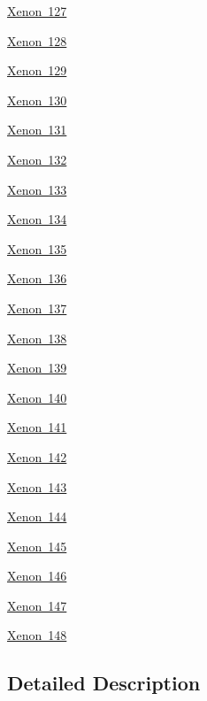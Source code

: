 \begin{DoxyCompactItemize}
\mbox{\hyperlink{group___isotope_const-_xenon-_xe127}{Xenon 127}}
\item 
\mbox{\hyperlink{group___isotope_const-_xenon-_xe128}{Xenon 128}}
\item 
\mbox{\hyperlink{group___isotope_const-_xenon-_xe129}{Xenon 129}}
\item 
\mbox{\hyperlink{group___isotope_const-_xenon-_xe130}{Xenon 130}}
\item 
\mbox{\hyperlink{group___isotope_const-_xenon-_xe131}{Xenon 131}}
\item 
\mbox{\hyperlink{group___isotope_const-_xenon-_xe132}{Xenon 132}}
\item 
\mbox{\hyperlink{group___isotope_const-_xenon-_xe133}{Xenon 133}}
\item 
\mbox{\hyperlink{group___isotope_const-_xenon-_xe134}{Xenon 134}}
\item 
\mbox{\hyperlink{group___isotope_const-_xenon-_xe135}{Xenon 135}}
\item 
\mbox{\hyperlink{group___isotope_const-_xenon-_xe136}{Xenon 136}}
\item 
\mbox{\hyperlink{group___isotope_const-_xenon-_xe137}{Xenon 137}}
\item 
\mbox{\hyperlink{group___isotope_const-_xenon-_xe138}{Xenon 138}}
\item 
\mbox{\hyperlink{group___isotope_const-_xenon-_xe139}{Xenon 139}}
\item 
\mbox{\hyperlink{group___isotope_const-_xenon-_xe140}{Xenon 140}}
\item 
\mbox{\hyperlink{group___isotope_const-_xenon-_xe141}{Xenon 141}}
\item 
\mbox{\hyperlink{group___isotope_const-_xenon-_xe142}{Xenon 142}}
\item 
\mbox{\hyperlink{group___isotope_const-_xenon-_xe143}{Xenon 143}}
\item 
\mbox{\hyperlink{group___isotope_const-_xenon-_xe144}{Xenon 144}}
\item 
\mbox{\hyperlink{group___isotope_const-_xenon-_xe145}{Xenon 145}}
\item 
\mbox{\hyperlink{group___isotope_const-_xenon-_xe146}{Xenon 146}}
\item 
\mbox{\hyperlink{group___isotope_const-_xenon-_xe147}{Xenon 147}}
\item 
\mbox{\hyperlink{group___isotope_const-_xenon-_xe148}{Xenon 148}}
\end{DoxyCompactItemize}


\subsection{Detailed Description}
